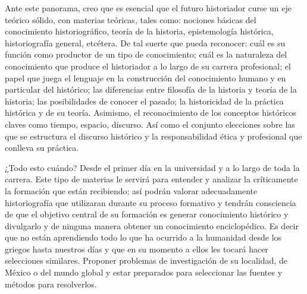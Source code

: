 Ante este panorama, creo que es esencial que el futuro historiador 
curse un eje teórico sólido, con materias teóricas, tales como: 
nociones básicas del conocimiento historiográfico, teoría de la 
historia, epistemología histórica, historiografía general, etcétera. De 
tal suerte que pueda reconocer: cuál es su función como productor de un 
tipo de conocimiento; cuál es la naturaleza del conocimiento que 
produce el historiador a lo largo de su carrera profesional; el papel 
que juega el lenguaje en la construcción del conocimiento humano y en 
particular del histórico; las diferencias entre filosofía de la 
historia y teoría de la historia; las posibilidades de conocer el 
pasado; la historicidad de la práctica histórica y de su teoría. 
Asimismo, el reconocimiento de los conceptos históricos claves como 
tiempo, espacio, discurso. Así como el conjunto elecciones sobre las 
que se estructura el discurso histórico y la responsabilidad ética y 
profesional que conlleva su práctica.

¿Todo esto cuándo? Desde el primer día en la universidad y a lo largo 
de toda la carrera. Este tipo de materias le servirá para entender y 
analizar la críticamente la formación que están recibiendo; así podrán 
valorar adecuadamente historiografía que utilizaran durante su proceso 
formativo y tendrán consciencia de que el objetivo central de su 
formación es generar conocimiento histórico y divulgarlo y de ninguna 
manera obtener un conocimiento enciclopédico. Es decir que no están 
aprendiendo todo lo que ha ocurrido a la humanidad desde los griegos 
hasta nuestros días y que en su momento a ellos les tocará hacer 
selecciones similares. Proponer problemas de investigación de su 
localidad, de México o del mundo global y estar preparados para 
seleccionar las fuentes y métodos para resolverlos.  

